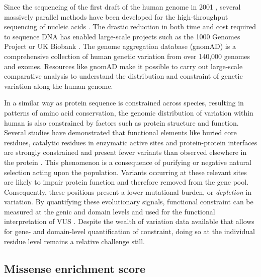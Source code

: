 Since the sequencing of the first draft of the human genome in 2001 \cite{CONSORTIUM_2001_GENOME}, several massively parallel methods have been developed for the high-throughput sequencing of nucleic acids \cite{KASIANOWICZ_1996_NANOPORE, MARGULIES_2005_PYROSEQUENCING, BENTLEY_2008_ILLUMINA, EID_2009_PACBIO, ROTHBERG_2011_IONTORRENT}. The drastic reduction in both time and cost required to sequence DNA has enabled large-scale projects such as the 1000 Genomes Project \cite{AUTON_2015_1000KG} or UK Biobank \cite{BYCROFT_2018_UKBIOBANK}. The genome aggregation database (gnomAD) is a comprehensive collection of human genetic variation from over 140,000 genomes and exomes. Resources like gnomAD make it possible to carry out large-scale comparative analysis to understand the distribution and constraint of genetic variation along the human genome.

In a similar way as protein sequence is constrained across species, resulting in patterns of amino acid conservation, the genomic distribution of variation within human is also constrained by factors such as protein structure and function. Several studies have demonstrated that functional elements like buried core residues, catalytic residues in enzymatic active sites and protein-protein interfaces are strongly constrained and present fewer variants than observed elsewhere in the protein \cite{GONG_2010_CONSTRAINT, BEER_2013_CONSTRAINT, DAVID_2015_CONSTRAINT, SIVLEY_2018_CONSTRAINT}. This phenomenon is a consequence of purifying or negative natural selection acting upon the population. Variants occurring at these relevant sites are likely to impair protein function and therefore removed from the gene pool. Consequently, these positions present a lower mutational burden, or \textit{depletion} in variation. By quantifying these evolutionary signals, functional constraint can be measured at the genic \cite{PETROVSKI_2013_CONSTRAINT} and domain \cite{GUSSOW_2016_CONSTRAINT} levels and used for the functional interpretation of VUS \cite{LI_2022_CONSTRAINT}. Despite the wealth of variation data available that allows for gene- and domain-level quantification of constraint, doing so at the individual residue level remains a relative challenge still.

\subsection{Missense enrichment score}

